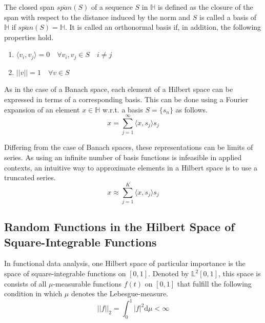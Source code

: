 \documentclass[11pt,twoside,a4paper]{article}
\begin{document}
	The closed span $\overline{span}(S)$ of a sequence $S$ in $\mathbb{H}$ is defined as the closure of the span with respect to the distance induced by the norm and $S$ is called a basis of $\mathbb{H}$ if $\overline{span}(S) = \mathbb{H}$.	It is called an orthonormal basis if, in addition, the following properties hold. 
	
	\begin{multicols}{2}
		\begin{enumerate}
			\item $\langle v_i, v_j \rangle = 0 \quad \forall v_i, v_j \in S \quad i \neq j$
			\item $\lvert \lvert v \rvert \rvert = 1 \quad \forall v \in S$
		\end{enumerate}
	\end{multicols}

	As in the case of a Banach space, each element of a Hilbert space can be expressed in terms of a corresponding basis. This can be done using a Fourier expansion of an element $x \in \mathbb{H}$ w.r.t. a basis $S = \{s_n\}$ as follows.
	\begin{equation}
		x = \sum_{j = 1}^{\infty}{\langle x, s_j \rangle}s_j
	\end{equation}
	
	Differing from the case of Banach spaces, these representations can be limits of series. As using an infinite number of basis functions is infeasible in applied contexts, an intuitive way to approximate elements in a Hilbert space is to use a truncated series.
	\begin{equation}
		x \approx \sum_{j = 1}^{K}{\langle x, s_j \rangle}s_j
	\end{equation}
	
	\subsection{Random Functions in the Hilbert Space of Square-Integrable Functions}
	In functional data analysis, one Hilbert space of particular importance is the space of square-integrable functions on $[0,1]$. Denoted by $\mathbb{L}^2[0,1]$, this space is consists of all $\mu$-measurable functions $f(t)$ on $[0,1]$ that fulfill the following condition in which $\mu$ denotes the Lebesgue-measure.
	\begin{equation}
		\lvert \lvert f \rvert \rvert_2 = \int_{0}^{1} \lvert f \rvert^2 \mathrm{d}\mu < \infty
	\end{equation}
	
\end{document}
